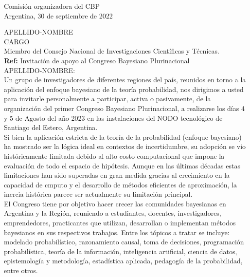 \documentclass[a4paper,11pt]{article}
\begin{document}
\begin{flushright}
Comisión organizadora del CBP \\
Argentina, 30 de septiembre de 2022
\end{flushright} 

\vspace{0.1cm}
\noindent
APELLIDO-NOMBRE\\
CARGO \\
Miembro del Consejo Nacional de Investigaciones Científicas y Técnicas.\\

\hfill \textbf{Ref:} Invitación de apoyo al Congreso Bayesiano Plurinacional \\

\noindent APELLIDO-NOMBRE:\\

\indent Un grupo de investigadores de diferentes regiones del país, reunidos en torno a la aplicación del enfoque bayesiano de la teoría probabilidad, nos dirigimos a usted para invitarle personalmente a participar, activa o pasivamente, de la organización del primer Congreso Bayesiano Plurinacional, a realizarse los días 4 y 5 de Agosto del año 2023 en las instalaciones del NODO tecnológico de Santiago del Estero, Argentina. \\

\indent Si bien la aplicación estricta de la teoría de la probabilidad (enfoque bayesiano) ha mostrado ser la lógica ideal en contextos de incertidumbre, su adopción se vio históricamente limitada debido al alto costo computacional que impone la evaluación de todo el espacio de hipótesis.
Aunque en las últimas décadas estas limitaciones han sido superadas en gran medida gracias al crecimiento en la capacidad de cmputo y el desarrollo de métodos eficientes de aproximación, la inercia histórica parece ser actualmente su limitación principal. \\

\indent El Congreso tiene por objetivo hacer crecer las comunidades bayesianas en Argentina y la Región, reuniendo a estudiantes, docentes, investigadores, emprendedores, practicantes que utilizan, desarrollan o implementan métodos bayesianos en sus respectivos trabajos. Entre los tópicos a tratar se incluye: modelado probabilístico, razonamiento causal, toma de decisiones, programación probabilística, teoría de la información, inteligencia artificial, ciencia de datos, epistemología y metodología, estadística aplicada, pedagogía de la probabilidad, entre otros. \\
\end{document}
